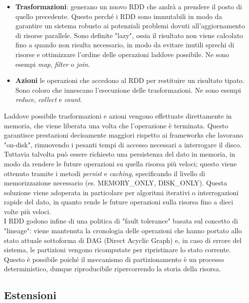 \begin{itemize}
	\item \textbf{Trasformazioni}: generano un nuovo RDD che andrà a prendere il posto di quello precedente. Questo perché i RDD sono immutabili in modo da garantire un sistema robusto ai potenziali problemi dovuti all'aggiornamento di risorse parallele. Sono definite "lazy", ossia il risultato non viene calcolato fino a quando non risulta necessario, in modo da evitare inutili sprechi di risorse e ottimizzare l'ordine delle operazioni laddove possibile. Ne sono esempi \textit{map}, \textit{filter} o \textit{join}.
	
	\item \textbf{Azioni} le operazioni che accedono al RDD per restituire un risultato tipato. Sono coloro che innescano l'esecuzione delle trasformazioni. Ne sono esempi \textit{reduce}, \textit{collect} e \textit{count}. 
\end{itemize}
Laddove possibile trasformazioni e azioni vengono effettuate direttamente in memoria, che viene liberata una volta che l'operazione è terminata. Questo garantisce prestazioni decisamente maggiori rispetto ai frameworks che lavorano "on-disk", rimuovendo i pesanti tempi di accesso necessari a interrogare il disco. Tuttavia talvolta può essere richiesto una persistenza del dato in memoria, in modo da rendere le future operazioni su quella risorsa più veloci; questo viene ottenuto tramite i metodi \textit{persist} e \textit{caching}, specificando il livello di memorizzazione necessario (es. MEMORY\_ONLY, DISK\_ONLY). Questa soluzione viene adoperata in particolare per algoritmi iterativi o interrogazioni rapide del dato, in quanto rende le future operazioni sulla risorsa fino a dieci volte più veloci.\\
I RDD godono infine di una politica di "fault tolerance" basata sul concetto di "lineage": viene mantenuta la cronologia delle operazioni  che hanno portato allo stato attuale sottoforma di DAG (Direct Acyclic Graph) e, in caso di errore del sistema, le partizioni vengono ricomputate per ripristinare lo stato corrente. Questo è possibile poiché il meccanismo di partizionamento è un processo deterministico, dunque riproducibile ripercorrendo la storia della risorsa. \newline

\subsection{Estensioni}

